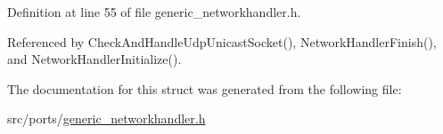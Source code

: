 \-Definition at line 55 of file generic\-\_\-networkhandler.\-h.



\-Referenced by \-Check\-And\-Handle\-Udp\-Unicast\-Socket(), \-Network\-Handler\-Finish(), and \-Network\-Handler\-Initialize().



\-The documentation for this struct was generated from the following file\-:\begin{DoxyCompactItemize}
\item 
src/ports/\hyperlink{generic__networkhandler_8h}{generic\-\_\-networkhandler.\-h}\end{DoxyCompactItemize}
